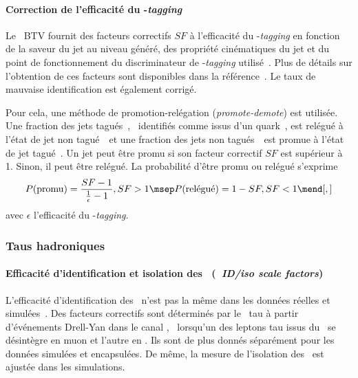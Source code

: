 \paragraph{Correction de l'efficacité du \quarkb-\emph{tagging}}
Le \POG\ BTV fournit des facteurs correctifs $SF$ à l'efficacité du \quarkb-\emph{tagging} en fonction de la saveur du jet au niveau généré, des propriété cinématiques du jet et du point de fonctionnement du discriminateur de \quarkb-\emph{tagging} utilisé~\cite{BTV}.
Plus de détails sur l'obtention de ces facteurs sont disponibles dans la référence~\cite{Sirunyan_heavy_flavor_jets_2018}.
Le taux de mauvaise identification est également corrigé.
\par
Pour cela, une méthode de promotion-relégation (\emph{promote-demote}) est utilisée.
Une fraction des jets tagués~\quarkb, \ie\ identifiés comme issus d'un quark~\quarkb, est relégué à l'état de jet non tagué~\quarkb\ et
une fraction des jets non tagués~\quarkb\ est promue à l'état de jet tagué~\quarkb.
Un jet peut être promu si son facteur correctif $SF$ est supérieur à 1.
Sinon, il peut être relégué.
La probabilité d'être promu ou relégué s'exprime
\begin{equation}
P(\text{promu}) = \frac{SF-1}{\frac{1}{\epsilon}-1}, SF > 1
\msep
P(\text{relégué}) = 1 - SF, SF < 1
\mend[,]
\end{equation}
avec $\epsilon$ l'efficacité du \quarkb-\emph{tagging}.
\subsubsection{Taus hadroniques}
\paragraph{Efficacité d'identification et isolation des \tauh\ (\emph{\tauh\ ID/iso scale factors})}
L'efficacité d'identification des \tauh\ n'est pas la même dans les données réelles et simulées~\cite{TauPOG}.
Des facteurs correctifs sont déterminés par le \POG\ tau à partir d'événements Drell-Yan dans le canal \mu\tauh, \ie\ lorsqu'un des leptons tau issus du \Zboson\ se désintègre en muon et l'autre en \tauh.
Ils sont de plus donnés séparément pour les données simulées et encapsulées.
De même, la mesure de l'isolation des \tauh\ est ajustée dans les simulations.
